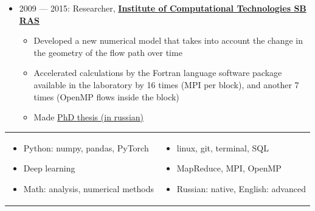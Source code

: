\documentclass[11pt]{article}
\begin{document}
\begin{itemize}
  \item 2009 — 2015:
	Researcher, \textbf{\href{http://www.ict.nsc.ru/en}{Institute of Computational Technologies SB RAS}}
	\begin{itemize}
		\item Developed a new numerical model that takes into account the change in the geometry of the flow path over time
		\item Accelerated calculations by the Fortran language software package available in the laboratory by 16 times (MPI per block), and another 7 times (OpenMP flows inside the block)
		\item Made \href{https://github.com/avalur/dissertation/blob/master/to_print/autoref_Avdyushenko.pdf}{PhD thesis (in russian)}
	\end{itemize}

\end{itemize}

\begin{longtable} {p{}p{}}
\vspace{-2em}
\begin{itemize}
	\item Python: numpy, pandas, PyTorch
	\item Deep learning
	\item Math: analysis, numerical methods
\end{itemize}
&
\vspace{-2em}
\begin{itemize}
	\item linux, git, terminal, SQL
	\item MapReduce, MPI, OpenMP
	\item Russian: native, English: advanced
\end{itemize}
\\
\end{longtable}
\end{document}
